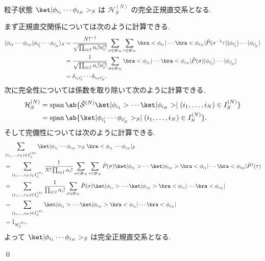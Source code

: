 \documentclass[uplatex,dvipdfmx,a4paper,11pt]{jlreq}
\makeatletter
\DeclareMathOperator{\Span}{span}
\newcommand{\HH}{\mathcal{H}}
\renewcommand{\SS}{\mathfrak{S}}
\renewcommand{\S}{\mathcal{S}}
\numberwithin{equation}{section}
\theoremstyle{definition}
\renewenvironment{proof}[1][\proofname]{\par
  \normalfont
  \topsep6\p@\@plus6\p@ \trivlist
  \item[\hskip\labelsep{\bfseries #1}\@addpunct{\bfseries}]\ignorespaces\quad\par
}{
  \qed\endtrivlist\@endpefalse
}
\renewcommand\proofname{証明}
\makeatother
\begin{document}
\begin{proposition}[Q21-20(iv)(v)(vi)]
  粒子状態 $\ket|\phi_{i_1}\cdots\phi_{i_N}>_S$ は $\HH_S^{(N)}$ の完全正規直交系となる.
  \label{symmetric completely orthonormal system}
\end{proposition}
\begin{proof}
  まず正規直交関係については次のように計算できる.
  \begin{align}
    \langle\phi_{i_1}\cdots\phi_{i_N}|\phi_{i_1'}\cdots\phi_{i_N'}\rangle_S & = \frac{N!^{-1}}{\sqrt{\prod_{i\in I}n_i!n_i'!}}\sum_{\sigma\in\SS_N}\sum_{\tau\in\SS_N}\bra<\phi_{i_1}|\cdots\bra<\phi_{i_N}|\hat{P}(\sigma^{-1}\tau)|\phi_{i_1'}\rangle\cdots|\phi_{i_N'}\rangle \\
                                                                            & = \frac{1}{\sqrt{\prod_{i\in I}n_i!n_i'!}}\sum_{\sigma\in\SS_N}\bra<\phi_{i_1}|\cdots\bra<\phi_{i_N}|\hat{P}(\sigma)|\phi_{i_1'}\rangle\cdots|\phi_{i_N'}\rangle                                   \\
                                                                            & = \delta_{i_1i_1'}\cdots\delta_{i_Ni_N'}.
  \end{align}
  次に完全性については係数を取り除いて次のように計算できる.
  \begin{align}
    \HH_S^{(N)} & = \Span\ab\{\hat{\S}^{(N)}\ket|\phi_{i_1}>\cdots\ket|\phi_{i_N}> \mid (i_1,\ldots,i_N)\in I_S^{(N)} \} \\
                & = \Span\ab\{\ket|\phi_{i_1'}\cdots\phi_{i_N'}>_S \mid (i_1,\ldots,i_N)\in I_S^{(N)} \}.
  \end{align}
  そして完備性については次のように計算できる.
  \begin{align}
     & \sum_{(i_1,\ldots,i_N)\in I_S^{(N)}}\ket|\phi_{i_1}\cdots\phi_{i_N}>_S\bra<\phi_{i_1}\cdots\phi_{i_N}|_S                                                                                                                     \\
     & = \sum_{(i_1,\ldots,i_N)\in I_S^{(N)}}\frac{1}{N!\prod_{i\in I}n_i!}\sum_{\sigma\in\SS_N}\sum_{\tau\in\SS_N}\hat{P}(\sigma)\ket|\phi_{i_1}>\cdots\ket|\phi_{i_N}>\bra<\phi_{i_1}|\cdots\bra<\phi_{i_N}|\hat{P}^\dagger(\tau) \\
     & = \sum_{(i_1,\ldots,i_N)\in I_S^{(N)}}\frac{1}{\prod_{i\in I}n_i!}\sum_{\sigma\in\SS_N}\hat{P}(\sigma)\ket|\phi_{i_1}>\cdots\ket|\phi_{i_N}>\bra<\phi_{i_1}|\cdots\bra<\phi_{i_N}|                                           \\
     & = \sum_{(i_1,\ldots,i_N)\in I_S^{(N)}}\ket|\phi_{i_1}>\cdots\ket|\phi_{i_N}>\bra<\phi_{i_1}|\cdots\bra<\phi_{i_N}|                                                                                                           \\
     & = \hat{1}_{\HH_S^{(N)}}.
  \end{align}
  よって $\ket|\phi_{i_1}\cdots\phi_{i_N}>_S$ は完全正規直交系となる.
\end{proof}
\end{document}

